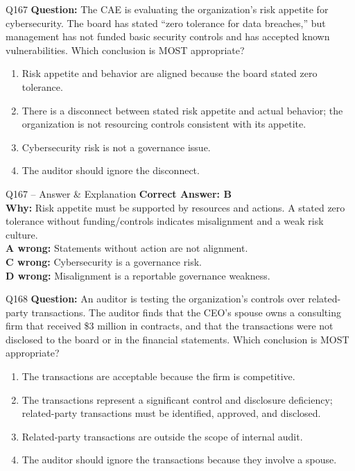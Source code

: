 \documentclass[aspectratio=169,10pt]{beamer}
\begin{document}
	\begin{frame}[t]{Q167}
		\small
		\textbf{Question:} The CAE is evaluating the organization's risk appetite for cybersecurity. The board has stated ``zero tolerance for data breaches,'' but management has not funded basic security controls and has accepted known vulnerabilities. Which conclusion is MOST appropriate?
		\begin{enumerate}[label=\Alph*.,itemsep=1pt,topsep=2pt]
			\item Risk appetite and behavior are aligned because the board stated zero tolerance.
			\item There is a disconnect between stated risk appetite and actual behavior; the organization is not resourcing controls consistent with its appetite.
			\item Cybersecurity risk is not a governance issue.
			\item The auditor should ignore the disconnect.
		\end{enumerate}
	\end{frame}
	
	\begin{frame}[t]{Q167 -- Answer \& Explanation}
		\small
		\textbf{Correct Answer: B} \\[4pt]
		\textbf{Why:} Risk appetite must be supported by resources and actions. A stated zero tolerance without funding/controls indicates misalignment and a weak risk culture. \\[4pt]
		\textbf{A wrong:} Statements without action are not alignment. \\[2pt]
		\textbf{C wrong:} Cybersecurity is a governance risk. \\[2pt]
		\textbf{D wrong:} Misalignment is a reportable governance weakness.
	\end{frame}
	
	\begin{frame}[t]{Q168}
		\small
		\textbf{Question:} An auditor is testing the organization's controls over related-party transactions. The auditor finds that the CEO's spouse owns a consulting firm that received \$3 million in contracts, and that the transactions were not disclosed to the board or in the financial statements. Which conclusion is MOST appropriate?
		\begin{enumerate}[label=\Alph*.,itemsep=1pt,topsep=2pt]
			\item The transactions are acceptable because the firm is competitive.
			\item The transactions represent a significant control and disclosure deficiency; related-party transactions must be identified, approved, and disclosed.
			\item Related-party transactions are outside the scope of internal audit.
			\item The auditor should ignore the transactions because they involve a spouse.
		\end{enumerate}
	\end{frame}
	
\end{document}
